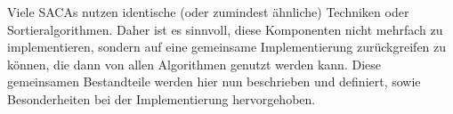 Viele  SACAs nutzen identische (oder zumindest ähnliche) Techniken oder Sortieralgorithmen. Daher ist es sinnvoll, diese Komponenten nicht mehrfach zu implementieren, sondern auf eine gemeinsame Implementierung zurückgreifen zu können, die dann von allen Algorithmen genutzt werden kann. Diese gemeinsamen Bestandteile werden hier nun beschrieben und definiert, sowie Besonderheiten bei der Implementierung hervorgehoben.
